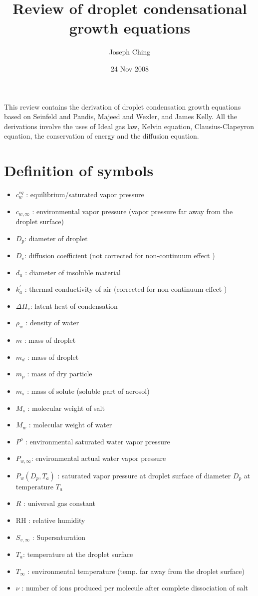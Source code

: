 \documentclass[12pt]{amsart}
\title{Review of droplet condensational growth equations}
\author{Joseph Ching}
\date{24 Nov 2008} %
\begin{document}
\maketitle
\tableofcontents

This review contains the derivation of droplet condensation growth equations based on Seinfeld and Pandis, Majeed and Wexler, and James Kelly. All the derivations involve the uses of Ideal gas law, Kelvin equation, Clausius-Clapeyron equation, the conservation of energy and the diffusion equation.

\section{Definition of symbols}

\begin{itemize}
\item $c_{w}^{eq}$ : equilibrium/saturated vapor pressure
\item $c_{w, \infty}$ : environmental vapor pressure (vapor pressure far away from the droplet surface)
\item $D_{p}$: diameter of droplet 
\item $D_{v}$: diffusion coefficient (not corrected for non-continuum effect )
\item $d_u$ : diameter of insoluble material
\item $k^{'}_{a}$ : thermal conductivity of air (corrected for non-continuum effect )
\item $\Delta H_{v}$: latent heat of condensation
\item $\rho_{w}$ : density of water
\item $m$ : mass of droplet
\item $m_d$ : mass of droplet
\item $m_p$ : mass of dry particle
\item $m_s$ : mass of solute (soluble part of aerosol)
\item $M_{s}$ : molecular weight of salt
\item $M_{w}$ : molecular weight of water
\item $P^{o}$ : environmental saturated water vapor pressure 
\item $P_{w,\infty} $: environmental actual water vapor pressure
\item $P_{w}(D_{p}, T_{a}) $ : saturated vapor pressure at droplet surface of diameter $ D_{p}$ at temperature $T_{a}$  
\item $R$ : universal gas constant
\item $\textrm{RH}$ : relative humidity
\item $S_{v, \infty}$ : Supersaturation  
\item $T_{a}$: temperature at the droplet surface
\item $T_{\infty}$ : environmental temperature (temp. far away from the droplet surface)
\item $\nu$ : number of ions produced per molecule after complete dissociation of salt 
\end{itemize}
\end{document}
